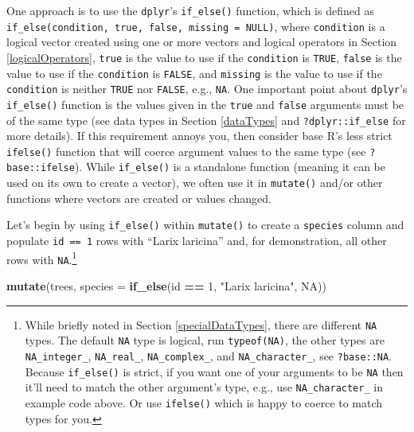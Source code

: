 \documentclass[
  11pt,
]{krantz}
\newenvironment{Shaded}{\begin{snugshade}}{\end{snugshade}}
\newcommand{\DataTypeTok}[1]{\textcolor[rgb]{0.13,0.29,0.53}{#1}}
\newcommand{\DecValTok}[1]{\textcolor[rgb]{0.00,0.00,0.81}{#1}}
\newcommand{\KeywordTok}[1]{\textcolor[rgb]{0.13,0.29,0.53}{\textbf{#1}}}
\newcommand{\NormalTok}[1]{#1}
\newcommand{\OperatorTok}[1]{\textcolor[rgb]{0.81,0.36,0.00}{\textbf{#1}}}
\newcommand{\OtherTok}[1]{\textcolor[rgb]{0.56,0.35,0.01}{#1}}
\newcommand{\StringTok}[1]{\textcolor[rgb]{0.31,0.60,0.02}{#1}}
\theoremstyle{definition}
\theoremstyle{definition}
\theoremstyle{definition}
\theoremstyle{definition}
\theoremstyle{remark}
\begin{document}
One approach is to use the \texttt{dplyr}'s \texttt{if\_else()} function, which is defined as \texttt{if\_else(condition,\ true,\ false,\ missing\ =\ NULL)}, where \texttt{condition} is a logical vector created using one or more vectors and logical operators in Section \ref{logicalOperators}, \texttt{true} is the value to use if the \texttt{condition} is \texttt{TRUE}, \texttt{false} is the value to use if the \texttt{condition} is \texttt{FALSE}, and \texttt{missing} is the value to use if the \texttt{condition} is neither \texttt{TRUE} nor \texttt{FALSE}, e.g., \texttt{NA}. One important point about \texttt{dplyr}'s \texttt{if\_else()} function is the values given in the \texttt{true} and \texttt{false} arguments must be of the same type (see data types in Section \ref{dataTypes} and \texttt{?dplyr::if\_else} for more details). If this requirement annoys you, then consider base R's less strict \texttt{ifelse()} function that will coerce argument values to the same type (see \texttt{?base::ifelse}).
While \texttt{if\_else()} is a standalone function (meaning it can be used on its own to create a vector), we often use it in \texttt{mutate()} and/or other functions where vectors are created or values changed.

Let's begin by using \texttt{if\_else()} within \texttt{mutate()} to create a \texttt{species} column and populate \texttt{id\ ==\ 1} rows with ``Larix laricina'' and, for demonstration, all other rows with \texttt{NA}.\footnote{While briefly noted in Section \ref{specialDataTypes}, there are different \texttt{NA} types. The default \texttt{NA} type is logical, run \texttt{typeof(NA)}, the other types are \texttt{NA\_integer\_}, \texttt{NA\_real\_}, \texttt{NA\_complex\_}, and \texttt{NA\_character\_}, see \texttt{?base::NA}. Because \texttt{if\_else()} is strict, if you want one of your arguments to be \texttt{NA} then it'll need to match the other argument's type, e.g., use \texttt{NA\_character\_} in example code above. Or use \texttt{ifelse()} which is happy to coerce to match types for you.}

\begin{Shaded}
\begin{Highlighting}[]
\KeywordTok{mutate}\NormalTok{(trees, }\DataTypeTok{species =} \KeywordTok{if\_else}\NormalTok{(id }\OperatorTok{==}\StringTok{ }\DecValTok{1}\NormalTok{, }\StringTok{"Larix laricina"}\NormalTok{, }\OtherTok{NA}\NormalTok{))}
\end{Highlighting}
\end{Shaded}
\end{document}
